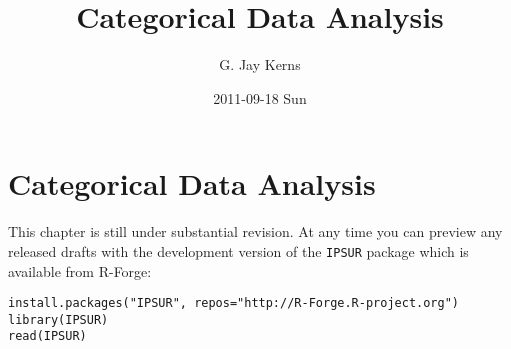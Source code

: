 \documentclass[11pt]{article}
\title{Categorical Data Analysis}
\author{G. Jay Kerns}
\date{2011-09-18 Sun}
\begin{document}
\maketitle




\section*{Categorical Data Analysis}
\label{sec-1}

\label{cha:Categorical-Data-Analysis}

This chapter is still under substantial revision. At any time you can preview any released drafts with the development version of the \texttt{IPSUR} package which is available from \textsf{R}-Forge:


\begin{verbatim}
install.packages("IPSUR", repos="http://R-Forge.R-project.org")
library(IPSUR)
read(IPSUR)
\end{verbatim}
\end{document}
